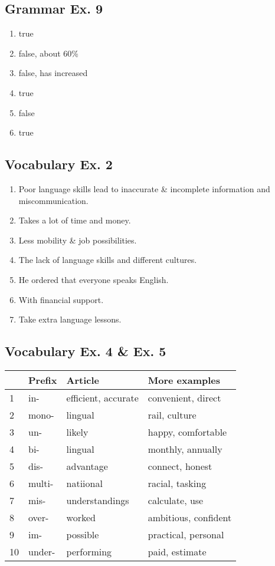 \documentclass[12pt, a4paper, oneside]{article}
\begin{document}
  \subsection{Grammar Ex. 9}
  \begin{enumerate}[1.]
    \item true 
    \item false, about 60\%
    \item false, has increased
    \item true
    \item false
    \item true
  \end{enumerate}


  \subsection{Vocabulary Ex. 2}
  \begin{enumerate}[1.]
    \item Poor language skills lead to inaccurate \& incomplete information and miscommunication.
    \item Takes a lot of time and money.
    \item Less mobility \& job possibilities.
    \item The lack of language skills and different cultures.
    \item He ordered that everyone speaks English.
    \item With financial support.
    \item Take extra language lessons.
  \end{enumerate} 

  \subsection{Vocabulary Ex. 4 \& Ex. 5}
  \begin{center}
    \begin{tabular}{|l|l|l|l|}
      \hline
      & Prefix & Article & More examples \\ \hline
      1 & in- & efficient, accurate & convenient, direct  \\ \hline
      2 & mono- & lingual & rail, culture \\ \hline
      3 & un- & likely & happy, comfortable \\ \hline
      4 & bi- & lingual & monthly, annually \\ \hline
      5 & dis- & advantage & connect, honest \\ \hline
      6 & multi- & natiional & racial, tasking \\ \hline
      7 & mis- & understandings & calculate, use \\ \hline
      8 & over- & worked & ambitious, confident \\ \hline
      9 & im- & possible & practical, personal \\ \hline
      10 & under- & performing & paid, estimate \\ \hline
    \end{tabular}
  \end{center}
\end{document}
